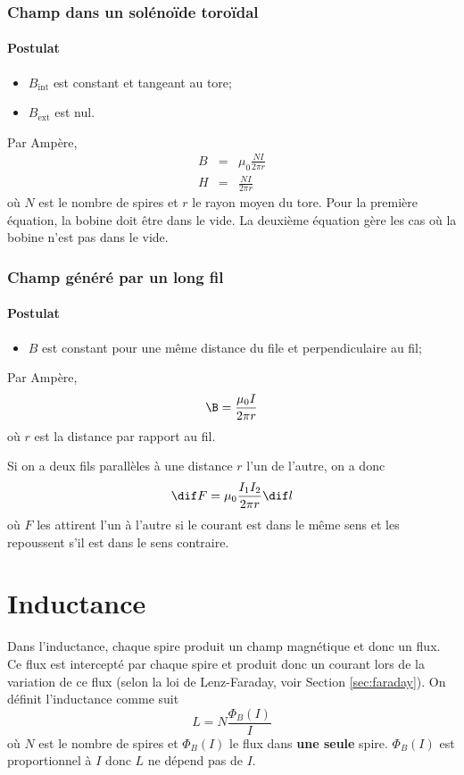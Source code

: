 \subsubsection{Champ dans un solénoïde toroïdal}
\label{sec:bst}
\paragraph{Postulat}
\begin{itemize}
	\item $B_\mathrm{int}$ est constant et tangeant au tore;
	\item $B_\mathrm{ext}$ est nul.
\end{itemize}
Par Ampère,
\begin{eqnarray*}
	B &=& \mu_0\frac{NI}{2\pi r}\\
	H &=& \frac{NI}{2\pi r}
\end{eqnarray*}
où $N$ est le nombre de spires et $r$ le rayon moyen du tore.
Pour la première équation, la bobine doit être dans le vide.
La deuxième équation gère les cas où la bobine n'est pas dans le vide.

\subsubsection{Champ généré par un long fil}
\paragraph{Postulat}
\begin{itemize}
	\item $B$ est constant pour une même distance du file et perpendiculaire au fil;
\end{itemize}
Par Ampère,
\[ \B = \frac{\mu_0I}{2\pi r} \]
où $r$ est la distance par rapport au fil.

Si on a deux fils parallèles à une distance $r$ l'un de l'autre, on a donc
\[ \dif F = \mu_0\frac{I_1I_2}{2\pi r}\dif l \]
où $F$ les attirent l'un à l'autre si le courant est dans le même sens et les repoussent s'il est dans le sens contraire.

\section{Inductance}
Dans l'inductance, chaque spire produit un champ magnétique et donc un flux.
Ce flux est intercepté par chaque spire et produit donc un courant lors de la variation de ce flux (selon la loi de Lenz-Faraday, voir Section \ref{sec:faraday}).
On définit l'inductance comme suit
\[ L = N\frac{\Phi_B(I)}{I} \]
où $N$ est le nombre de spires et $\Phi_B(I)$ le flux dans \textbf{une seule} spire.
$\Phi_B(I)$ est proportionnel à $I$ donc $L$ ne dépend pas de $I$.

